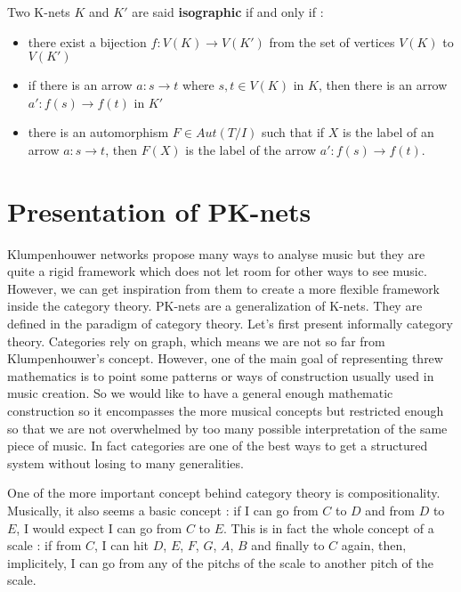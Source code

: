 \begin{defn}
    Two K-nets $K$ and $K'$ are said \textbf{isographic} if and only if :
    \begin{itemize}
        \item there exist a bijection $f:V(K)\rightarrow V(K')$ from the set of vertices $V(K)$ to $V(K')$
        \item if there is an arrow $a:s\rightarrow t$ where $s,t\in V(K)$ in $K$, then there is an arrow $a':f(s)\rightarrow f(t)$ in $K'$
        \item there is an automorphism $F \in Aut(T/I)$\label{nomencl:Aut} such that if $X$ is the label of an arrow $a:s\rightarrow t$, then $F(X)$ is the label of the arrow $a':f(s)\rightarrow f(t)$.
    \end{itemize}
\end{defn}




\section{Presentation of PK-nets}
Klumpenhouwer networks propose many ways to analyse music but they are quite a rigid framework which does not let room for other ways to see music. However, we can get inspiration from them to create a more flexible framework inside the category theory. PK-nets\cite{PAAE2016} are a generalization of K-nets. They are defined in the paradigm of category theory. Let's first present informally category theory.
Categories rely on graph, which means we are not so far from Klumpenhouwer's concept. However, one of the main goal of representing threw mathematics is to point some patterns or ways of construction usually used in music creation. So we would like to have a general enough mathematic construction so it encompasses the more musical concepts but restricted enough so that we are not overwhelmed by too many possible interpretation of the same piece of music.
In fact categories are one of the best ways to get a structured system without losing to many generalities.

One of the more important concept behind category theory is compositionality. Musically, it also seems a basic concept : if I can go from $C$ to $D$ and from $D$ to $E$, I would expect I can go from $C$ to $E$. This is in fact the whole concept of a scale : if from $C$, I can hit $D$, $E$, $F$, $G$, $A$, $B$ and finally to $C$ again, then, implicitely, I can go from any of the pitchs of the scale to another pitch of the scale.

